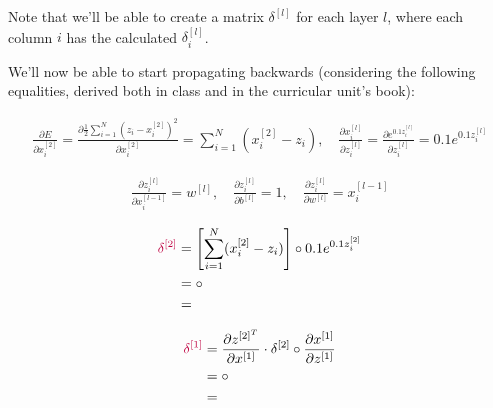 \documentclass[12pt]{article}
\begin{document}
\begin{enumerate}[leftmargin=\labelsep]
        Note that we'll be able to create a matrix $\delta^{[l]}$ for each
        layer $l$, where each column $i$ has the calculated $\delta_i^{[l]}$.

        We'll now be able to start propagating backwards (considering the following equalities,
        derived both in class and in the curricular unit's book):


        \begin{equation*}
          \begin{aligned}
            \frac{\partial E}{\partial x_i^{[2]}} = \frac{\partial \frac{1}{2}\sum_{i=1}^N (z_i - x_i^{[2]})^2}{\partial x_i^{[2]}} = \sum_{i=1}^N (x_i^{[2]} - z_i), \quad
            \frac{\partial x_i^{[l]}}{\partial z_i^{[l]}} = \frac{\partial e^{0.1z_i^{[l]}}}{\partial z_i^{[l]}} = 0.1e^{0.1z_i^{[l]}}
          \end{aligned}
        \end{equation*}

        \begin{equation*}
          \begin{aligned}
            \frac{\partial z_i^{[l]}}{\partial x_i^{[l - 1]}} = w^{[l]}, \quad
            \frac{\partial z_i^{[l]}}{\partial b^{[l]}} = 1, \quad
            \frac{\partial z_i^{[l]}}{\partial w^{[l]}} = x_i^{[l - 1]}
          \end{aligned}
        \end{equation*}

        \begin{equation*}
          \begin{aligned}
            \textcolor{purple}{\delta^{[2]}} & = \left[\sum_{i=1}^N(x_i^{[2]} - z_i)\right] \circ 0.1e^{0.1z_i^{[2]}}          \\
                                             & =  \circ  \\
                                             & = 
          \end{aligned}
        \end{equation*}

        \begin{equation*}
          \begin{aligned}
            \textcolor{purple}{\delta^{[1]}} & = \frac{\partial z^{[2]^T}}{\partial x^{[1]}} \cdot \delta^{[2]} \circ \frac{\partial x^{[1]}}{\partial z^{[1]}} \\
                                             & =  \circ                            \\
                                             & = 
          \end{aligned}
        \end{equation*}


\end{enumerate}
\end{document}
